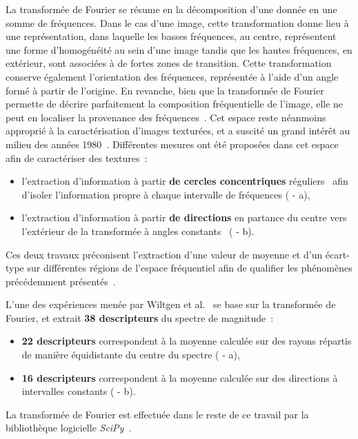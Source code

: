 La transformée de Fourier se résume en la décomposition d'une donnée en une somme de fréquences. Dans le cas d'une image, cette transformation donne lieu à une représentation, dans laquelle les basses fréquences, au centre, représentent une forme d'homogénéité au sein d'une image tandis que les hautes fréquences, en extérieur, sont associées à de fortes zones de transition. Cette transformation conserve également l'orientation des fréquences, représentée à l'aide d'un angle formé à partir de l'origine. En revanche, bien que la transformée de Fourier permette de décrire parfaitement la composition fréquentielle de l'image, elle ne peut en localiser la provenance des fréquences~\cite{Wiltgen2008}. Cet espace reste néanmoins approprié à la caractérisation d'images texturées, et a suscité un grand intérêt au milieu des années 1980~\cite{Persoon1986}. Différentes mesures ont été proposées dans cet espace afin de caractériser des textures~:
\begin{itemize}
    \item l'extraction d'information à partir \textbf{de cercles concentriques} réguliers~\cite{Smach2008a, Wiltgen2008} afin d'isoler l'information propre à chaque intervalle de fréquences ( - a),
    \item l'extraction d'information à partir \textbf{de directions} en partance du centre vers l'extérieur de la transformée à angles constants~\cite{Wiltgen2008} ( - b).
\end{itemize}
Ces deux travaux préconisent l'extraction d'une valeur de moyenne et d'un écart-type sur différentes régions de l'espace fréquentiel afin de qualifier les phénomènes précédemment présentés~\cite{Smach2008a, Wiltgen2008}. 

L'une des expériences menée par Wiltgen et al.~\cite{Wiltgen2008} se base sur la transformée de Fourier, et extrait \textbf{38 descripteurs} du spectre de magnitude~:
\begin{itemize}
    \item \textbf{22 descripteurs} correspondent à la moyenne calculée sur des rayons répartis de manière équidistante du centre du spectre ( - a),
    \item \textbf{16 descripteurs} correspondent à la moyenne calculée sur des directions à intervalles constants ( - b).
\end{itemize}
La transformée de Fourier est effectuée dans le reste de ce travail par la bibliothèque logicielle \textit{SciPy}~\cite{Virtanen2020}.\par

